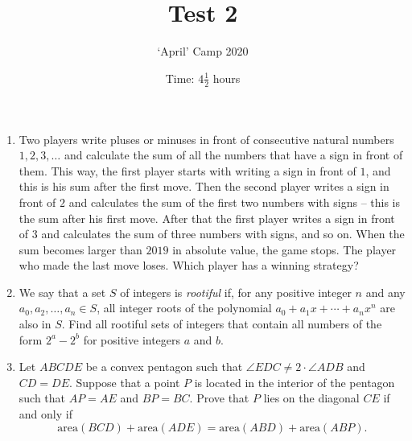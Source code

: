 \documentclass[12pt]{article}
\title{Test 2}
\author{`April' Camp 2020}
\date{Time: $4\frac{1}{2}$ hours}
\begin{document}
\maketitle
\thispagestyle{empty}


\begin{enumerate}[1.]

\vfill
\item %
Two players write pluses or minuses in front of consecutive natural numbers $1, 2, 3, \dotsc$ and calculate the sum of all the numbers that have a sign in front of them.
This way, the first player starts with writing a sign in front of $1$, and this is his sum after the first move.
Then the second player writes a sign in front of $2$ and calculates the sum of the first two numbers with signs -- this is the sum after his first move.
After that the first player writes a sign in front of $3$ and calculates the sum of three numbers with signs, and so on.
When the sum becomes larger than $2019$ in absolute value, the game stops.
The player who made the last move loses.
Which player has a winning strategy?


\vfill
\item %
We say that a set $S$ of integers is \emph{rootiful} if, for any positive integer $n$ and any $a_0, a_2, \dotsc, a_n \in S$, all integer roots of the polynomial $a_0 +a_1 x +\dotsb +a_n x^n$ are also in $S$.
Find all rootiful sets of integers that contain all numbers of the form $2^a-2^b$ for positive integers $a$ and $b$.


\vfill
\item %
\newcommand{\area}[1]{\text{area}\left(#1\right)}
Let $ABCDE$ be a convex pentagon such that $\angle EDC \neq 2 \cdot \angle ADB$ and $CD = DE$.
Suppose that a point $P$ is located in the interior of the pentagon such that $AP = AE$ and $BP = BC$.
Prove that $P$ lies on the diagonal $CE$ if and only if
\[ \area{BCD} +\area{ADE} = \area{ABD} +\area{ABP}. \]

\vfill
\end{enumerate}
\end{document}

